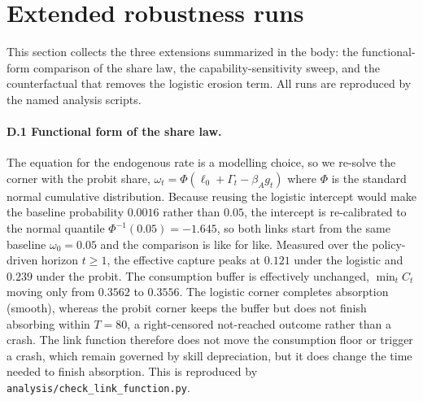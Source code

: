 \documentclass[12pt]{article}
\theoremstyle{plain}
\begin{document}
\section{Extended robustness runs}
This section collects the three extensions summarized in the body: the
functional-form comparison of the share law, the capability-sensitivity sweep,
and the counterfactual that removes the logistic erosion term. All runs are
reproduced by the named analysis scripts.

\paragraph{D.1 Functional form of the share law.}
The equation for the endogenous rate is a modelling choice, so we re-solve the
corner with the probit share, $\omega_t=\Phi(\ell_0+\Gamma_t-\beta_A g_t)$
where $\Phi$ is the standard normal cumulative distribution. Because reusing
the logistic intercept would make the baseline probability $0.0016$ rather than
$0.05$, the intercept is re-calibrated to the normal quantile $\Phi^{-1}(0.05)=-1.645$,
so both links start from the same baseline $\omega_0=0.05$ and the comparison
is like for like. Measured over the policy-driven horizon $t\geq1$, the
effective capture peaks at $0.121$ under the logistic and $0.239$ under the
probit. The consumption buffer is effectively unchanged, $\min_t C_t$ moving
only from $0.3562$ to $0.3556$. The logistic corner completes absorption
(smooth), whereas the probit corner keeps the buffer but does not finish
absorbing within $T=80$, a right-censored not-reached outcome rather than a
crash. The link function therefore does not move the consumption floor or
trigger a crash, which remain governed by skill depreciation, but it does
change the time needed to finish absorption. This is reproduced by
\texttt{analysis/check\_link\_function.py}.
\end{document}
